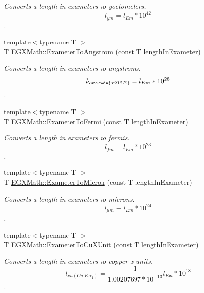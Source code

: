 \begin{DoxyCompactItemize}
\begin{DoxyCompactList}\small\item\em Converts a length in exameters to yoctometers. \[ l_{ym}=l_{Em} * 10^{42} \]. \end{DoxyCompactList}\item 
{\footnotesize template$<$typename T $>$ }\\T \mbox{\hyperlink{group___e_g_x_math-_conversions-_length_conversions-_s_i-_exameter-_non-_s_i_ga24d2ee057470ce37f99d31451e010a22}{E\+G\+X\+Math\+::\+Exameter\+To\+Angstrom}} (const T length\+In\+Exameter)
\begin{DoxyCompactList}\small\item\em Converts a length in exameters to angstroms. \[ l_{\unicode{x212B}}=l_{Em} * 10^{28} \]. \end{DoxyCompactList}\item 
{\footnotesize template$<$typename T $>$ }\\T \mbox{\hyperlink{group___e_g_x_math-_conversions-_length_conversions-_s_i-_exameter-_non-_s_i_ga0aa0524461cbce1fcc102b847545d212}{E\+G\+X\+Math\+::\+Exameter\+To\+Fermi}} (const T length\+In\+Exameter)
\begin{DoxyCompactList}\small\item\em Converts a length in exameters to fermis. \[ l_{fm}=l_{Em} * 10^{23} \]. \end{DoxyCompactList}\item 
{\footnotesize template$<$typename T $>$ }\\T \mbox{\hyperlink{group___e_g_x_math-_conversions-_length_conversions-_s_i-_exameter-_non-_s_i_ga3356bb6585e02757a196b299c29660c1}{E\+G\+X\+Math\+::\+Exameter\+To\+Micron}} (const T length\+In\+Exameter)
\begin{DoxyCompactList}\small\item\em Converts a length in exameters to microns. \[ l_{\mu m}=l_{Em} * 10^{24} \]. \end{DoxyCompactList}\item 
{\footnotesize template$<$typename T $>$ }\\T \mbox{\hyperlink{group___e_g_x_math-_conversions-_length_conversions-_s_i-_exameter-_non-_s_i_gacb2c9fea6b2c2d12ee485f378f5a6af0}{E\+G\+X\+Math\+::\+Exameter\+To\+Cu\+X\+Unit}} (const T length\+In\+Exameter)
\begin{DoxyCompactList}\small\item\em Converts a length in exameters to copper x units. \[ l_{xu(Cu\ K\alpha_1)}= \frac{1}{1.00207697*10^{-13}} l_{Em} * 10^{18}\]. \end{DoxyCompactList}\item 

\end{DoxyCompactItemize}
